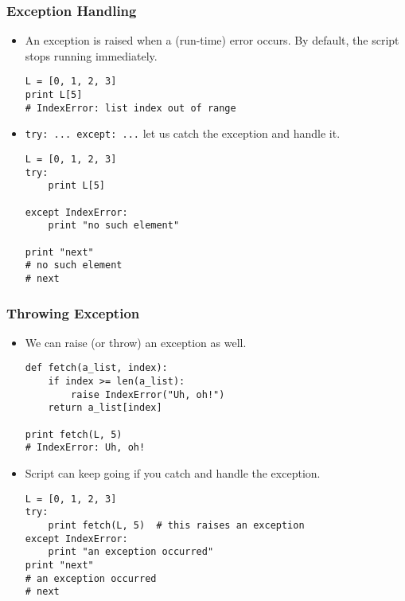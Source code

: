 \documentclass{beamer}
\begin{document}
\begin{frame}[fragile]
\frametitle{Exception Handling}
\begin{itemize}
\item An exception is raised when a (run-time) error
      occurs. By default, the script stops running 
      immediately.
\begin{lstlisting}
L = [0, 1, 2, 3]
print L[5]
# IndexError: list index out of range
\end{lstlisting}
\item \lstinline{try: ... except: ...}
      let us catch the exception and handle it.
\begin{lstlisting}
L = [0, 1, 2, 3]
try:
    print L[5]           

except IndexError:
    print "no such element"

print "next"
# no such element
# next
\end{lstlisting}
\end{itemize}
\end{frame}

\begin{frame}[fragile]
\frametitle{Throwing Exception}
\begin{itemize}
\item We can raise (or throw) an exception as well.
\begin{lstlisting}
def fetch(a_list, index):
    if index >= len(a_list):
        raise IndexError("Uh, oh!")
    return a_list[index]

print fetch(L, 5)
# IndexError: Uh, oh!
\end{lstlisting}
\item Script can keep going if you catch and handle the
      exception.
\begin{lstlisting}
L = [0, 1, 2, 3]
try:
    print fetch(L, 5)  # this raises an exception 
except IndexError:
    print "an exception occurred"
print "next"
# an exception occurred
# next
\end{lstlisting}
\end{itemize}
\end{frame}
\end{document}
